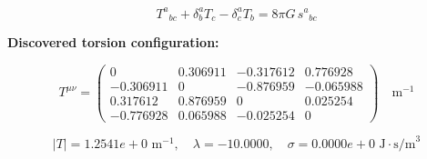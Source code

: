 
\begin{equation}
  T^a{}_{bc} + \delta^a_b T_c - \delta^a_c T_b = 8\pi G \, s^a{}_{bc}
\end{equation}

\textbf{Discovered torsion configuration:}

\begin{equation}
  T^{\mu\nu} = \begin{pmatrix}
    0 & 0.306911 & -0.317612 & 0.776928 \\
    -0.306911 & 0 & -0.876959 & -0.065988 \\
    0.317612 & 0.876959 & 0 & 0.025254 \\
    -0.776928 & 0.065988 & -0.025254 & 0
  \end{pmatrix} \quad \text{m}^{-1}
\end{equation}

\begin{equation}
  |T| = 1.2541e+0 \text{ m}^{-1}, \quad
  \lambda = -10.0000, \quad
  \sigma = 0.0000e+0 \text{ J}\cdot\text{s/m}^3
\end{equation}